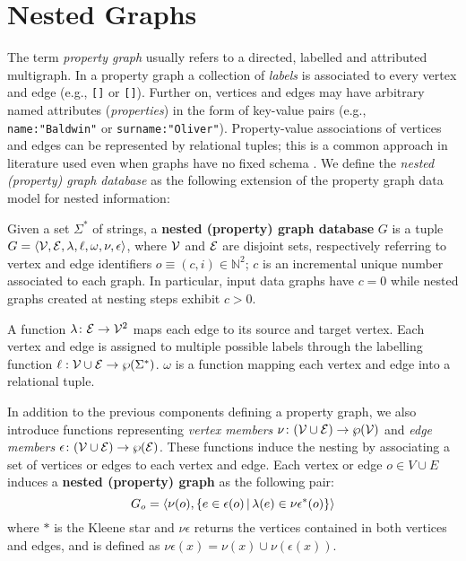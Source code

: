 
\section{Nested Graphs}
\label{sec:model}
The term \textit{property graph}  \cite{angles12} usually refers to a directed, labelled and attributed multigraph. 
In a property graph a collection of \textit{labels}  is associated to every vertex and edge (e.g., \texttt{[]} or \texttt{[]}). Further on, vertices and edges may have arbitrary named attributes (\textit{properties}) in the form of key-value pairs (e.g., \texttt{name:"Baldwin"} or \texttt{surname:"Oliver"}). Property-value associations of vertices and edges can be represented by relational tuples; this is a common approach in literature used even when graphs have no fixed schema \cite{angles12}. We define the\textit{ nested (property) graph database} as the following extension of the property graph data model for nested information:

\begin{definition}
Given a set $\Sigma^*$ of strings,
	a \textbf{nested (property) graph database} $G$ is a tuple $G=\Braket{\mathcal{V}, \mathcal{E}, \lambda,\ell,\omega,\nu,\epsilon}$, where $\mathcal{V}$ and $\mathcal{E}$ are disjoint sets, respectively referring to vertex and edge identifiers $o\equiv(c,i)\in\mathbb{N}^2$; $c$ is an incremental unique number associated to each graph. In particular, input data graphs have $c=0$ while  nested graphs created at nesting steps exhibit $c>0$. 
	
	A function $\lambda\colon \mathcal{E}\to \mathcal{V}^2$ maps each edge to its source and target vertex. Each vertex and edge is assigned to multiple possible labels through the labelling function $\ell:\mathcal{V}\cup \mathcal{E}\to \wp(\Sigma^*)$.  $\omega$ is a function mapping each vertex and edge into a relational tuple.
	
	In addition to the previous components defining a property graph, we also introduce functions representing \textit{vertex members} $\nu\colon (\mathcal{V}\cup \mathcal{E})\to\wp(\mathcal{V})$ and \textit{edge members} $\epsilon\colon(\mathcal{V}\cup \mathcal{E})\to \wp(\mathcal{E})$. These functions induce the nesting by associating a set of vertices or edges to each vertex and edge. Each vertex or edge $o\in V\cup E$ induces a \textbf{nested (property) graph} as the following pair:
	\[G_o=\Braket{\nu(o),\{e\in\epsilon(o)|\lambda(e)\in {\nu\epsilon}^*(o)\}}\]
	where $*$ is the Kleene star and $\nu\epsilon$ returns the vertices contained in both vertices and edges, and is defined as $\nu\epsilon(x)=\nu(x)\cup \nu(\epsilon(x))$.
\end{definition}


